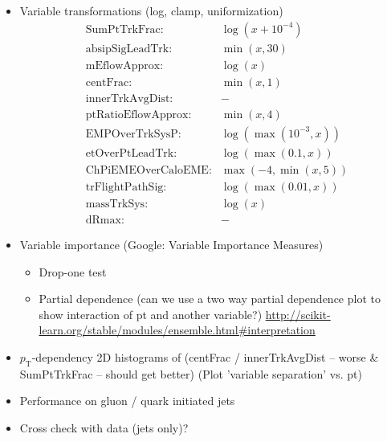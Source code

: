 \begin{itemize}
\item Variable transformations (log, clamp, uniformization)
  \begin{align}
    &\text{SumPtTrkFrac:} &\log(x + 10^{-4}) \\
    &\text{absipSigLeadTrk:} &\min(x, 30) \\
    &\text{mEflowApprox:} &\log(x) \\
    &\text{centFrac:} &\min(x, 1) \\
    &\text{innerTrkAvgDist:} &- \\
    &\text{ptRatioEflowApprox:} &\min(x, 4) \\
    &\text{EMPOverTrkSysP:} &\log(\max(10^{-3}, x)) \\
    &\text{etOverPtLeadTrk:} &\log(\max(0.1, x)) \\
    &\text{ChPiEMEOverCaloEME:} &\max(-4, \min(x, 5)) \\
    &\text{trFlightPathSig:} &\log(\max(0.01, x)) \\
    &\text{massTrkSys:} &\log(x) \\
    &\text{dRmax:} &-
  \end{align}

\item Variable importance (Google: Variable Importance Measures)
  \begin{itemize}
  \item Drop-one test
  \item Partial dependence (can we use a two way partial dependence plot to
    show interaction of pt and another variable?)
    \url{http://scikit-learn.org/stable/modules/ensemble.html#interpretation}
  \end{itemize}

\item $p_\mathrm{T}$-dependency 2D histograms of (centFrac / innerTrkAvgDist --
  worse \& SumPtTrkFrac -- should get better) (Plot 'variable separation' vs.
  pt)

\item Performance on gluon / quark initiated jets

\item Cross check with data (jets only)?

\end{itemize}

